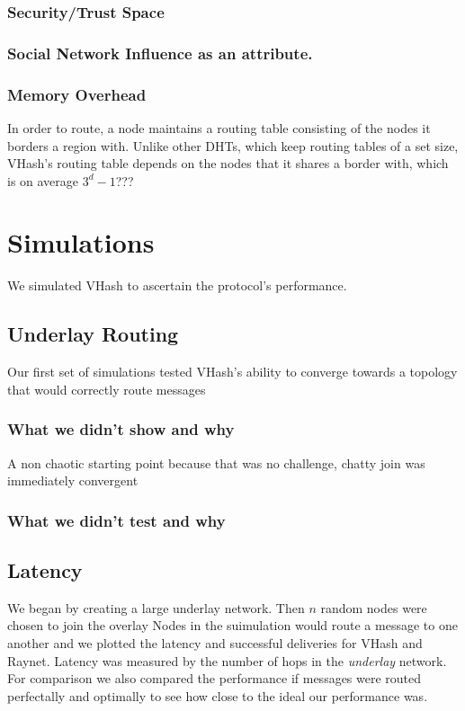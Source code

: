 \documentclass{IEEEtran}
\begin{document}
\subsubsection{Security/Trust Space}

\subsubsection{Social Network Influence as an attribute.}





\subsubsection{Memory Overhead}
In order to route, a node maintains a routing table consisting of the nodes it borders a region with.  Unlike other DHTs, which keep routing tables of a set size, VHash's routing table depends on the nodes that it shares a border with, which is on average $3^d -1$???


\section{Simulations}
We simulated VHash to ascertain the protocol's performance. 




\subsection{Underlay Routing}
Our first set of simulations tested VHash's ability to converge towards a topology that would correctly route messages


\subsubsection*{What we didn't show and why}
A non chaotic starting point because that was no challenge, chatty join was immediately convergent

\subsubsection*{What we didn't test and why}

\subsection{Latency}
We began by creating a large underlay network.  Then $n$ random nodes were chosen to join the overlay  Nodes in the suimulation would route a message to one another and we plotted the latency and successful deliveries for VHash and Raynet.  Latency was measured by the number of hops in the \textit{underlay} network.  For comparison we also compared the performance if messages were routed perfectally and optimally to see how close to the ideal our performance was. 
\end{document}
